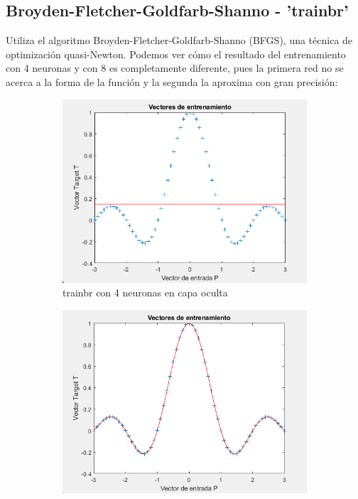 \documentclass[a4paper, 12pt]{article}
\begin{document}
            
            \subsection{Broyden-Fletcher-Goldfarb-Shanno - 'trainbr'}
                Utiliza el algoritmo Broyden-Fletcher-Goldfarb-Shanno (BFGS), una técnica de optimización quasi-Newton. Podemos ver cómo el resultado del entrenamiento con 4 neuronas y con 8 es completamente diferente, pues la primera red no se acerca a la forma de la función y la segunda la aproxima con gran precisión:

                \begin{figure}[htp!]
                    \caption{Levenberg-Marquardt}
                    \begin{subfigure}{0.49\textwidth}
                        \centering
        		      \includegraphics[width=\textwidth]{figures/parte1/Ej2/Ej2_fig4_trainbr.png}
                        \caption{trainbr con 4 neuronas en capa oculta}
                    \end{subfigure}
                    \begin{subfigure}{0.49\textwidth}
                        \includegraphics[width=\textwidth]{figures/parte1/Ej2/Ej2_fig8_trainbr_8neuronas.png}

\end{subfigure}
\end{figure}
\end{document}
